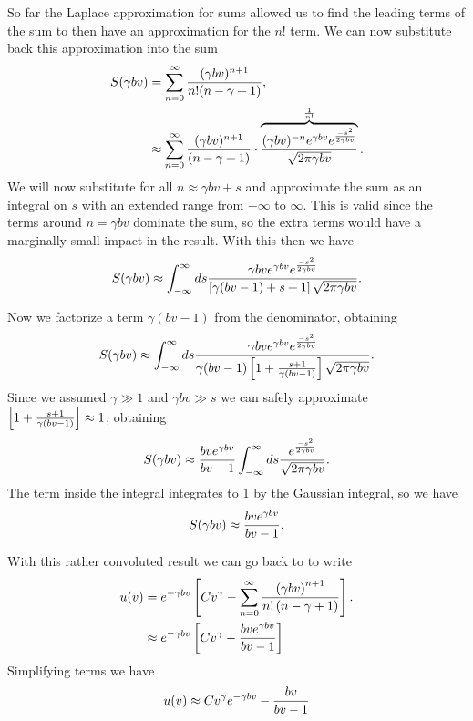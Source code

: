 So far the Laplace approximation for sums allowed us to find the leading terms
of the sum to then have an approximation for the $n!$ term. We can now
substitute back this approximation into the sum
\begin{align}
  S(\gamma b v) &= \sum_{n = 0}^{\infty} {(\gamma b v)^{n + 1} \over
                                        n! (n - \gamma + 1)},\\
  &\approx \sum_{n = 0}^{\infty}
  {(\gamma b v)^{n + 1} \over (n - \gamma + 1)} \cdot
  \overbrace{
  { (\gamma b v)^{-n} e^{\gamma b v} e^{-s^2 \over 2 \gamma b v}
  \over
  \sqrt{2 \pi \gamma b v}
  }}^{1 \over n!}.
\end{align}
We will now substitute for all $n \approx \gamma b v + s$ and approximate the
sum as an integral on $s$ with an extended range from $-\infty$ to $\infty$.
This is valid since the terms around $n = \gamma b v$ dominate the sum, so the
extra terms would have a marginally small impact in the result. With this then
we have
\begin{equation}
  S(\gamma b v) \approx \int_{-\infty}^{\infty} ds {
  \gamma b v e^{\gamma b v} e^{-s^2 \over 2 \gamma b v}
  \over
  \left[ \gamma (b v - 1) + s + 1 \right] \sqrt{2 \pi \gamma b v}
  }.
\end{equation}

Now we factorize a term $\gamma (b v - 1)$ from the denominator, obtaining
\begin{equation}
  S(\gamma b v) \approx \int_{-\infty}^{\infty} ds {
  \gamma b v e^{\gamma b v} e^{-s^2 \over 2 \gamma b v}
  \over
  \gamma (b v - 1) \left[ 1 + {s + 1 \over \gamma (b v - 1) }\right]
  \sqrt{2 \pi \gamma b v}
  }.
\end{equation}
Since we assumed $\gamma \gg 1$ and $\gamma b v \gg s$ we can safely approximate
$\left[ 1 + {s + 1 \over \gamma (b v - 1) }\right] \approx 1$, obtaining
\begin{equation}
  S(\gamma b v) \approx {b v e^{\gamma b v} \over b v - 1}
  \int_{-\infty}^{\infty} ds
  {e^{-s^2 \over 2 \gamma b v}
  \over
  \sqrt{2 \pi \gamma b v}}.
\end{equation}
The term inside the integral integrates to 1 by the Gaussian integral, so we
have
\begin{equation}
  S(\gamma b v) \approx {b v e^{\gamma b v} \over b v - 1}.
\end{equation}

With this rather convoluted result we can go back to \eref[eq_SI_27_uofv] to
write
\begin{align}
  u(v) &= e^{-\gamma b v} \left[ C v^{\gamma}
  - \sum_{n=0}^\infty {\left( \gamma b v \right)^{n+1} \over
  n! \left( n - \gamma + 1 \right)} \right].\\
  &\approx e^{-\gamma b v}
  \left[ C v^{\gamma} - {b v e^{\gamma b v} \over b v - 1} \right]
\end{align}
Simplifying terms we have
\begin{equation}
  u(v) \approx C v^{\gamma} e^{-\gamma b v}
  - {b v \over b v - 1}
  \label{eq_SI_30_uofv}
\end{equation}

